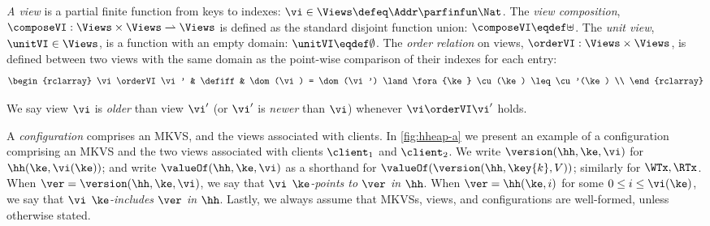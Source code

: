\begin{definition}[Views]
\label{def:view}
\label{def:cuts}
\label{def:views}
\emph{A view} is a partial finite function from keys to indexes:
$
\vi \in \Views \defeq \Addr \parfinfun \Nat 
$.                                                                 
The \emph{view composition}, $\composeVI: \Views \times \Views \rightharpoonup \Views$ is defined as the standard disjoint function union: $\composeVI \eqdef \uplus$. 
The \emph{unit view}, $\unitVI \in \Views$, is a function with an empty domain: $\unitVI \eqdef \emptyset$. 
The \emph{order relation} on views, $\orderVI: \Views \times \Views$, is defined between two views with the same domain as the point-wise comparison of their indexes for each entry: 
\[
\begin{rclarray}
    \vi \orderVI \vi' & \defiff & \dom(\vi) = \dom(\vi') \land \fora{\ke} \cu(\ke) \leq \cu'(\ke) \\
\end{rclarray}
\]
\end{definition}
%
We say view $\vi$ is \emph{older} than view $\vi'$ (or $\vi'$ is \emph{newer} than $\vi$) whenever $\vi \orderVI \vi'$ holds.

 A \emph{configuration} comprises an MKVS, and the views associated with clients.
In \cref{fig:hheap-a} we present an example of a configuration comprising an MKVS and the two views associated with clients $\client_1$ and $\client_2$. 
We write $\version(\hh, \ke, \vi)$ for $\hh(\ke, \vi(\ke))$; 
and write $\valueOf(\hh, \ke, \vi)$ as a shorthand for $ \valueOf(\version(\hh, \key{k}, V))$; similarly for $\WTx, \RTx$.
When $\ver = \version(\hh, \ke, \vi)$, we say that \emph{$\vi$ $\ke$-points to $\ver$ in $\hh$}. 
When $\ver = \hh(\ke, i)$ for some $0 \leq i \le \vi(\ke)$, we say that \emph{$\vi$ $\ke$-includes $\ver$ in $\hh$}.
Lastly, we always assume that MKVSs, views, and configurations are well-formed, unless otherwise stated.



